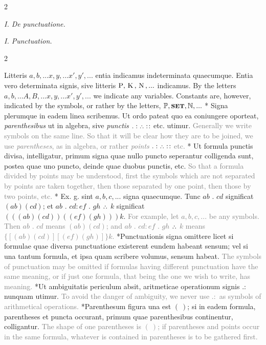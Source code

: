 \documentclass{book}
\newcommand{\pppNoSpace}{\leavevmode\lower0ex\hbox{.}\kern-0.1em\raise0.7ex\hbox{.}\kern-0.1em\lower0ex\hbox{.}} %
\newcommand{\K}{\mathop{\thinspace \text{K} \thinspace}}
\newcommand{\N}{\mathop{\thinspace \text{N} \thinspace}}
\newcommand{\setOfSets}{\mathord{\text{{\footnotesize \textbf{SET}}}}}
\newcommand\irrelavent[1]{\textcolor{gray}{#1}}
\newcommand\peanoHeadingSmall[1]{ \vspace{0.75cm} \textit{#1} \nopagebreak[4]

\vspace{0.25cm} \nopagebreak[1]}
\newenvironment{translateTwoCol}
               { %
                 \columnratio{0.5, 0.5} \begin{paracol}{2}
                 \newcommand{\LAT}{\switchcolumn[0]*}
                 \newcommand{\ENG}{\switchcolumn[1]}
               }
               { %
                 \let\ENG\undefined
                 \let\LAT\undefined
                 \end{paracol}
               }
\begin{document}
\begin{translateTwoCol}
\centering
{}
{}
\peanoHeadingSmall{I. De punctuatione.}
\ENG
\peanoHeadingSmall{I. Punctuation.}
\end{translateTwoCol}

\begin{translateTwoCol}
Litteris $a,b,... x,y,... x', y',...$ entia indicamus indeterminata quaecumque. Entia vero determinata signis, sive litteris $\text{P}, \K, \N,...$ indicamus.
\ENG
By the letters $a,b,... A,B,... x,y,... x', y',...$ we indicate any variables. Constants are, however, indicated by the symbols, or rather by the letters, $\mathbb{P}, \setOfSets, \mathbb{N},...$ 
\LAT
Signa plerumque in eadem linea scribemus. Ut ordo pateat quo ea coniungere oporteat, \emph{parenthesibus} ut in algebra, sive \emph{punctis} $. : \pppNoSpace :\hspace{0.1em}:$ etc. utimur.
\ENG
\irrelavent{Generally we write symbols on the same line. So that it will be clear how they are to be joined, we use \emph{parentheses}, as in algebra, or rather \emph{points} $. : \pppNoSpace :\hspace{0.1em}:$ etc.}
\LAT
Ut formula punctis divisa, intelligatur, primum signa quae nullo puncto seperantur colligenda sunt, postea quae uno puncto, deinde quae duobus punctis, etc.
\ENG
\irrelavent{So that a formula divided by points may be understood, first the symbols which are not separated by points are taken together, then those separated by one point, then those by two points, etc.}
\LAT
Ex. g. sint $a,b,c,...$ signa quaecumque. Tunc $ab$ $.$ $cd$ significat $(ab)(cd)$; et $ab$ $.$ $cd:ef$ $.$ $gh$ $\pppNoSpace$ $k$ significat $(((ab)(cd))((ef)(gh)))k$.
\ENG
\irrelavent{For example, let $a,b,c,...$ be any symbols. Then $ab$ $.$ $cd$ means $(ab)(cd)$; and $ab$ $.$ $cd:ef$ $.$ $gh$ $\pppNoSpace$ $k$ means $\{[(ab)(cd)][(ef)(gh)]\}k$.}
\LAT Punctuationis signa omittere licet si formulae quae diversa punctuatione existerent eundem habeant sensum; vel si una tantum formula, et ipsa quam scribere volumus, sensum habeat.
\ENG \irrelavent{The symbols of punctuation may be omitted if formulas having different punctuation have the same meaning, or if just one formula, that being the one we wish to write, has meaning.}
\LAT Ut ambiguitatis periculum absit, aritmeticae operationum signis $. :$ nunquam utimur.
\ENG \irrelavent{To avoid the danger of ambiguity, we never use $. :$ as symbols of arithmetical operations.}
\LAT Parenthesum figura una est $( \ )$; si in eadem formula, parentheses et puncta occurant, primum quae parenthesibus continentur, colligantur.
\ENG \irrelavent{The shape of one parentheses is $( \ )$; if parentheses and points occur in the same formula, whatever is contained in parentheses is to be gathered first.}  %
\end{translateTwoCol}
\end{document}
